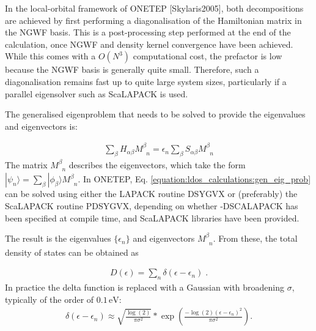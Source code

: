 \documentclass[letterpaper,10pt,english]{sphinxmanual}
\begin{document}
In the local-orbital framework of ONETEP
{[}Skylaris2005{]}, both decompositions are
achieved by first performing a diagonalisation of the Hamiltonian matrix
in the NGWF basis. This is a post-processing step performed at the end
of the calculation, once NGWF and density kernel convergence have been
achieved. While this comes with a \(O(N^{3})\) computational cost,
the prefactor is low because the NGWF basis is generally quite small.
Therefore, such a diagonalisation remains fast up to quite large system
sizes, particularly if a parallel eigensolver such as ScaLAPACK is used.

The generalised eigenproblem that needs to be solved to provide the
eigenvalues and eigenvectors is:

\label{\detokenize{ldos_calculations:equation-gen-eig-prob}}\begin{equation}\label{equation:ldos_calculations:gen_eig_prob}
\begin{split}\sum_{\beta}H_{\alpha\beta}M_{\phantom{\beta}n}^{\beta}=\epsilon_{n}\sum_{\beta}S_{\alpha\beta}M_{\phantom{\beta}n}^{\beta}\end{split}
\end{equation}
The matrix \(M_{\phantom{\beta}n}^{\beta}\) describes the
eigenvectors, which take the form
\(|\psi_{n}\rangle=\sum_{\beta}|\phi_{\beta}\rangle
M_{\phantom{\beta}n}^{\beta}\). In ONETEP, Eq. \eqref{equation:ldos_calculations:gen_eig_prob} can be
solved using either the LAPACK routine DSYGVX or (preferably) the
ScaLAPACK routine PDSYGVX, depending on whether -DSCALAPACK has been
specified at compile time, and ScaLAPACK libraries have been provided.

The result is the eigenvalues \(\{\epsilon_{n}\}\) and eigenvectors
\(M_{\phantom{\beta}n}^{\beta}\). From these, the total density of
states can be obtained as

\label{\detokenize{ldos_calculations:equation-dos}}\begin{equation}\label{equation:ldos_calculations:DOS}
\begin{split}D(\epsilon)=\sum_{n}\delta(\epsilon-\epsilon_{n})\;.\end{split}
\end{equation}
In practice the delta function is replaced with a Gaussian with
broadening \(\sigma\), typically of the order of
\(0.1\,\mathrm{eV}\):
\begin{equation*}
\begin{split}\delta(\epsilon-\epsilon_{n})\approx\sqrt{\frac{\log(2)}{\pi\sigma^2}}*\exp{\left(\frac{-\log(2)(\epsilon-\epsilon_n)^2}{\pi\sigma^2}\right)}.\end{split}
\end{equation*}
\end{document}
